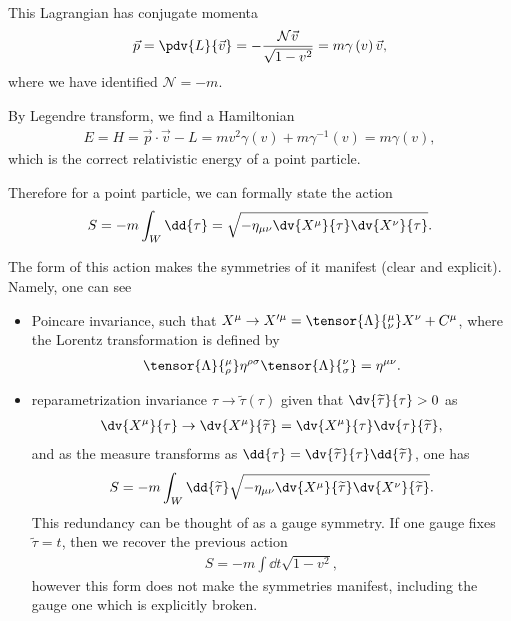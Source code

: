 This Lagrangian has conjugate momenta
\begin{align}
    \vec{p} = \pdv{L}{\vec{v}} = -\frac{\mathcal{N}\vec{v}}{\sqrt{1 - v^2} } = m \gamma \left( v \right) \vec{v}
,\end{align}
where we have identified $\mathcal{N} = -m$.

By Legendre transform, we find a Hamiltonian
\begin{align}
    E = H = \vec{p} \cdot \vec{v} - L = m v^2 \gamma \left( v \right) + m \gamma^{-1} \left( v \right) = m \gamma \left( v \right) 
,\end{align}
which is the correct relativistic energy of a point particle.

Therefore for a point particle, we can formally state the action
\begin{align}
    S = -m \int_W \dd{\tau} = \sqrt{-\eta_{\mu \nu} \dv{X^{\mu}}{\tau} \dv{X^{\nu}}{\tau}}  
.\end{align}

The form of this action makes the symmetries of it manifest (clear and explicit).
Namely, one can see
\begin{itemize}
    \item Poincare invariance, such that $X^{\mu} \to X'^{\mu} = \tensor{\Lambda}{^{\mu}_\nu} X^{\nu} + C^{\mu}$, where the Lorentz transformation is defined by
        \begin{align}
            \tensor{\Lambda}{^{\mu}_\rho} \eta^{\rho \sigma} \tensor{\Lambda}{^{\nu}_\sigma} = \eta^{\mu \nu}
        .\end{align}
    \item reparametrization invariance $\tau \to \widetilde{\tau}\left( \tau \right) $ given that $\dv{\widetilde{\tau}}{\tau} > 0$ as
        \begin{align}
            \dv{X^{\mu}}{\tau} \to \dv{X^{\mu}}{\widetilde{\tau}} = \dv{X^{\mu}}{\tau} \dv{\tau}{\widetilde{\tau}}
        ,\end{align}
        and as the measure transforms as $\dd{\tau} = \dv{\widetilde{\tau}}{\tau} \dd{\widetilde{\tau}}$, one has
        \begin{align}
            S = -m \int_W \dd{\widetilde{\tau}} \sqrt{-\eta_{\mu \nu} \dv{X^{\mu}}{\widetilde{\tau}} \dv{X^{\nu}}{\widetilde{\tau}}} 
        .\end{align}
        This redundancy can be thought of as a gauge symmetry. If one gauge fixes $\widetilde{\tau} = t$, then we recover the previous action
        \begin{align}
            S = -m \int \dd{t} \sqrt{1 - v^2} 
        ,\end{align}
        however this form does not make the symmetries manifest, including the gauge one which is explicitly broken. 
\end{itemize}

